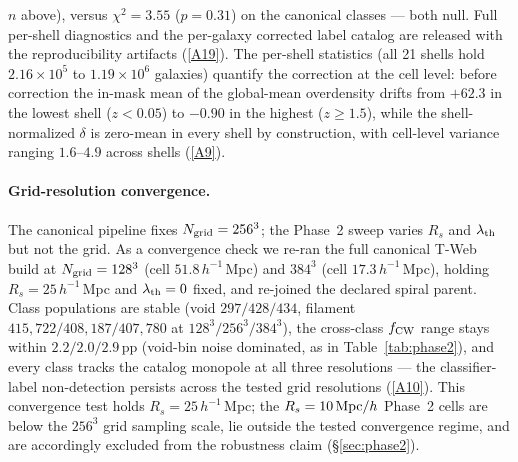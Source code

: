 \documentclass[twocolumn,linenumbers]{aastex702}
\newcommand{\repoBase}{https://github.com/Hubify-Projects/bigbounce/blob/main}
\begin{document}
$n$ above), versus $\chi^2 = 3.55$ ($p = 0.31$) on
the canonical classes — both null. Full per-shell diagnostics and
the per-galaxy
corrected label catalog are released with the reproducibility
artifacts
(\href{\repoBase/pipelines/p5\_desi\_chirality/outputs/16\_cosmic\_web\_zshell\_corrected.json}{[A19]}).
The per-shell statistics (all 21 shells hold $2.16\times10^{5}$ to
$1.19\times10^{6}$ galaxies) quantify the correction at the cell
level: before correction the in-mask mean of the global-mean
overdensity drifts from $+62.3$ in the lowest shell ($z<0.05$) to
$-0.90$ in the highest ($z \geq 1.5$), while the shell-normalized
$\delta$ is zero-mean in every shell by construction, with cell-level
variance ranging $1.6$--$4.9$ across shells
(\href{\repoBase/pipelines/p5\_desi\_chirality/outputs/22\_r24conf\_local\_batch.json}{[A9]}).

\paragraph{Grid-resolution convergence.} The canonical pipeline fixes
$N_{\rm grid} = 256^3$; the Phase~2 sweep varies $R_s$ and
$\lambda_{\rm th}$ but not the grid. As a convergence check we re-ran
the full canonical T-Web build at $N_{\rm grid} = 128^3$ (cell
$51.8\,h^{-1}$\,Mpc) and $384^3$ (cell $17.3\,h^{-1}$\,Mpc), holding
$R_s = 25\,h^{-1}$\,Mpc and $\lambda_{\rm th} = 0$ fixed, and re-joined
the declared spiral parent. Class populations are stable (void
$297/428/434$, filament $415{,}722/408{,}187/407{,}780$ at
$128^3/256^3/384^3$), the cross-class $f_{\rm CW}$ range stays within
$2.2/2.0/2.9$\,pp (void-bin noise dominated, as in
Table~\ref{tab:phase2}), and every class tracks the catalog monopole
at all three resolutions — the classifier-label non-detection persists
across the tested grid resolutions
(\href{\repoBase/pipelines/p5\_desi\_chirality/outputs/17\_v0151\_closure\_recomputes.json}{[A10]}).
This convergence test holds $R_s = 25\,h^{-1}$\,Mpc; the
$R_s = 10\,{\rm Mpc}/h$ Phase~2 cells are below the $256^3$ grid
sampling scale, lie outside the tested convergence regime, and are
accordingly excluded from the robustness claim
(\S\ref{sec:phase2}).
\end{document}
